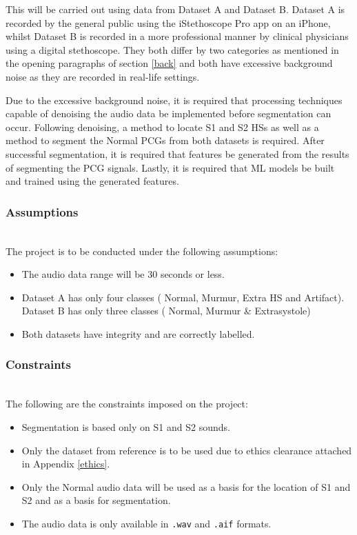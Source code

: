 \documentclass[10pt,twocolumn]{witseiepaper}
\begin{document}
This will be carried out using data from Dataset A and Dataset B. Dataset A is recorded by the general public using the iStethoscope Pro app on an iPhone, whilst Dataset B is recorded in a more professional manner by clinical physicians using a digital stethoscope. They both differ by two categories as mentioned in the opening paragraphs of section \ref{back} and both have excessive background noise as they are recorded in real-life settings. 

Due to the excessive background noise, it is required that processing techniques capable of denoising the audio data be implemented before segmentation can occur. Following denoising, a method to locate S1 and S2 HSs as well as a method to segment the Normal PCGs from both datasets is required. After successful segmentation, it is required that features be generated from the results of segmenting the PCG signals. Lastly, it is required that ML models be built and trained using the generated features. 

\subsubsection{Assumptions}
\textcolor{white}{Ke a leboga Jeso}\\
The project is to be conducted under the following assumptions:
\begin{itemize}
    \item The audio data range will be 30 seconds or less.
    \item Dataset A has only four classes ( Normal, Murmur, Extra HS and Artifact). Dataset B has only three classes ( Normal, Murmur \& Extrasystole)
    \item Both datasets have integrity and are correctly labelled.
\end{itemize}

\subsubsection{Constraints}
\label{sec:constraints}
\textcolor{white}{O re swarele...}\\
The following are the constraints imposed on the project:
\begin{itemize}
    \item Segmentation is based only on S1 and S2 sounds.
    \item Only the dataset from reference \cite{bentley} is to be used due to ethics clearance attached in Appendix \ref{ethics}.
    \item Only the Normal audio data will be used as a basis for the location of S1 and S2 and as a basis for segmentation.
    \item The audio data is only available in \texttt{.wav} and \texttt{.aif} formats.
\end{itemize}
\end{document}
